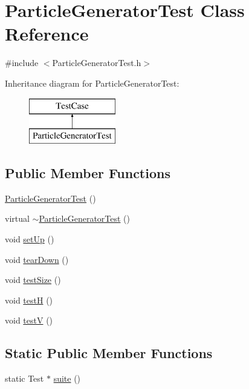 \hypertarget{classParticleGeneratorTest}{\section{Particle\+Generator\+Test Class Reference}
\label{classParticleGeneratorTest}
}


{\ttfamily \#include $<$Particle\+Generator\+Test.\+h$>$}

Inheritance diagram for Particle\+Generator\+Test\+:\begin{figure}[H]
\begin{center}
\leavevmode
\includegraphics[height=2.000000cm]{classParticleGeneratorTest}
\end{center}
\end{figure}
\subsection*{Public Member Functions}
\begin{DoxyCompactItemize}
\item 
\hyperlink{classParticleGeneratorTest_af27d139a180f3d07501c726069abac48}{Particle\+Generator\+Test} ()
\item 
virtual \hyperlink{classParticleGeneratorTest_a2882f3ae2508ac7541649ad0445f76e6}{$\sim$\+Particle\+Generator\+Test} ()
\item 
void \hyperlink{classParticleGeneratorTest_a5c5c45fa56773e0218ba9f827f7e78ca}{set\+Up} ()
\item 
void \hyperlink{classParticleGeneratorTest_a69d4bc5f9c69e3c6f34e0c3af750aa94}{tear\+Down} ()
\item 
void \hyperlink{classParticleGeneratorTest_a21a9be7b17877cd6ea72f035916b3006}{test\+Size} ()
\item 
void \hyperlink{classParticleGeneratorTest_afe1c677462a302e11d48fe3640887522}{test\+H} ()
\item 
void \hyperlink{classParticleGeneratorTest_a3abb9ab7d29dcae6918715be309c8162}{test\+V} ()
\end{DoxyCompactItemize}
\subsection*{Static Public Member Functions}
\begin{DoxyCompactItemize}
\item 
static Test $\ast$ \hyperlink{classParticleGeneratorTest_a8592c1512fe90ad63bbf19370b0168e3}{suite} ()
\end{DoxyCompactItemize}
